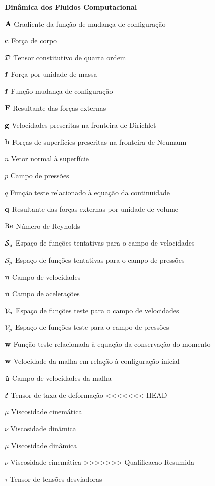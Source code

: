\begin{simbolos}
    \item[\textbf{Dinâmica dos Fluidos Computacional}]
    \item[$\mathbf{A}$] Gradiente da função de mudança de configuração
    \item[$\mathbf{c}$] Força de corpo
    \item[$\mathcal{D}$] Tensor constitutivo de quarta ordem
    \item[$\mathbf{f}$] Força por unidade de massa
    \item[$\mathbf{f}$] Função mudança de configuração
    \item[$\mathbf{F}$] Resultante das forças externas
    \item[$\mathbf{g}$] Velocidades prescritas na fronteira de Dirichlet
    \item[$\mathbf{h}$] Forças de superfícies prescritas na fronteira de Neumann
    \item[$n$] Vetor normal à superfície
    \item[$p$] Campo de pressões
    \item[$q$] Função teste relacionado à equação da continuidade
    \item[$\mathbf{q}$] Resultante das forças externas por unidade de volume
    \item[$\mathrm{Re}$] Número de Reynolds
    \item[$\mathcal{S}_u$] Espaço de funções tentativas para o campo de velocidades
    \item[$\mathcal{S}_p$] Espaço de funções tentativas para o campo de pressões
    \item[$\mathbf{u}$] Campo de velocidades
    \item[$\dot{\mathbf{u}}$] Campo de acelerações
    \item[$\mathcal{V}_u$] Espaço de funções teste para o campo de velocidades
    \item[$\mathcal{V}_p$] Espaço de funções teste para o campo de pressões
    \item[$\mathbf{w}$] Função teste relacionada à equação da conservação do momento
    \item[$\mathbf{w}$] Velocidade da malha em relação à configuração inicial
    \item[$\mathbf{\hat{u}}$] Campo de velocidades da malha
    \item[$\mathbf{\dot{\varepsilon}}$] Tensor de taxa de deformação
<<<<<<< HEAD
    \item[$\mu$] Viscosidade cinemática
    \item[$\nu$] Viscosidade dinâmica
=======
    \item[$\mu$] Viscosidade dinâmica
    \item[$\nu$] Viscosidade cinemática
>>>>>>> Qualificacao-Resumida
    \item[$\tau$] Tensor de tensões desviadoras


\end{simbolos}
